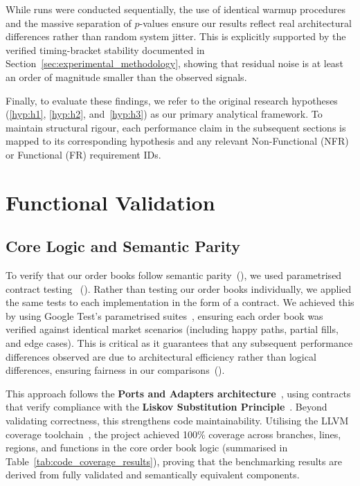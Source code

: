 While runs were conducted sequentially, the use of identical warmup 
procedures and the massive separation of $p$-values ensure our results 
reflect real architectural differences rather than random system jitter. 
This is explicitly supported by the verified timing-bracket stability 
documented in Section~\ref{sec:experimental_methodology}, showing that 
residual noise is at least an order of magnitude smaller than the observed signals.

Finally, to evaluate these findings, we refer to the original research hypotheses
(\ref{hyp:h1}, \ref{hyp:h2}, and~\ref{hyp:h3}) as our primary analytical framework. 
To maintain structural rigour, each performance claim in the subsequent sections is 
mapped to its corresponding hypothesis and any relevant Non-Functional (NFR) or Functional (FR) requirement IDs.



\section{Functional Validation}

\subsection{Core Logic and Semantic Parity}
To verify that our order books follow semantic parity~(), we used 
parametrised contract testing~\citep{fowler_contract_testing} (). Rather than 
testing our order books individually, we applied the same tests to each 
implementation in the form of a contract. We achieved this by using Google Test's 
parametrised suites~\citep{googletest_param}, ensuring each order book was 
verified against identical market scenarios (including happy paths, partial 
fills, and edge cases). This is critical as it guarantees that any subsequent 
performance differences observed are due to architectural efficiency rather than 
logical differences, ensuring fairness in our comparisons~().

This approach follows the \textbf{Ports and Adapters architecture}~\citep{cockburn_hexagonal}, 
using contracts that verify compliance with the \textbf{Liskov Substitution Principle}~\citep{liskov1987}. 
Beyond validating correctness, this strengthens code maintainability. Utilising the 
LLVM coverage toolchain~\citep{llvm_cov}, the project achieved 100\% coverage 
across branches, lines, regions, and functions in the core order book logic 
(summarised in Table~\ref{tab:code_coverage_results}), proving that the 
benchmarking results are derived from fully validated and semantically equivalent components.

